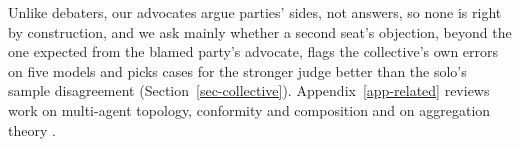 Unlike debaters, our advocates argue parties' sides, not answers, so
none is right by construction, and we ask mainly whether a second seat's
objection, beyond the one expected from the blamed party's advocate, flags
the collective's own errors on five models and picks cases for the stronger
judge better than the solo's sample disagreement (Section~\ref{sec-collective}).
Appendix~\ref{app-related} reviews work on multi-agent topology, conformity
and composition and on aggregation theory
\citep{ladha1992condorcet,list2002aggregating}.

